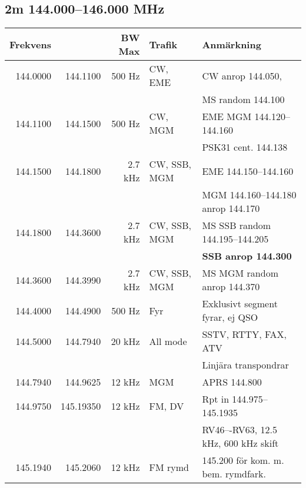 \documentclass[10pt,swedish,a4paper]{article}
\begin{document}
\begin{landscape}
\subsection{2m 144.000--146.000 MHz}
\begin{tabular}{rrrll}
	Frekvens &           &  BW Max & Trafik       & Anmärkning                              \\ \hline
	144.0000 &  144.1100 &  500 Hz & CW, EME      & CW anrop 144.050,                       \\
	         &           &         &              & MS random 144.100                       \\ \hline
	144.1100 &  144.1500 &  500 Hz & CW, MGM      & EME MGM 144.120--144.160                \\
	         &           &         &              & PSK31 cent. 144.138                     \\ \hline
	144.1500 &  144.1800 & 2.7 kHz & CW, SSB, MGM & EME 144.150--144.160                    \\
	         &           &         &              & MGM 144.160--144.180 anrop 144.170      \\ \hline
	144.1800 &  144.3600 & 2.7 kHz & CW, SSB, MGM & MS SSB random 144.195--144.205          \\
	         &           &         &              & \textbf{SSB anrop 144.300}              \\ \hline
	144.3600 &  144.3990 & 2.7 kHz & CW, SSB, MGM & MS MGM random anrop 144.370             \\ \hline
	144.4000 &  144.4900 &  500 Hz & Fyr          & Exklusivt segment fyrar, ej QSO         \\ \hline
	144.5000 &  144.7940 &  20 kHz & All mode     & SSTV, RTTY, FAX, ATV                    \\
	         &           &         &              & Linjära transpondrar                    \\ \hline
	144.7940 &  144.9625 &  12 kHz & MGM          & APRS 144.800                            \\ \hline
	144.9750 & 145.19350 &  12 kHz & FM, DV       & Rpt in 144.975--145.1935                \\
	         &           &         &              & RV46–-RV63, 12.5 kHz, 600 kHz skift     \\ \hline
	145.1940 &  145.2060 &  12 kHz & FM rymd      & 145.200 för kom. m. bem. rymdfark.      \\ \hline

\end{tabular}
\end{landscape}
\end{document}
